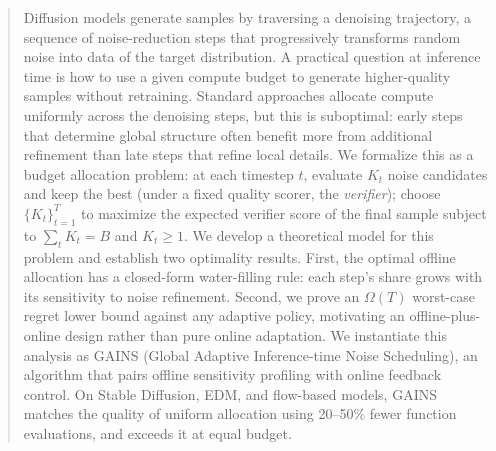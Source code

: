 \begin{abstract}
Diffusion models generate samples by traversing a denoising trajectory, a sequence of noise-reduction steps that progressively transforms random noise into data of the target distribution. A practical question at inference time is how to use a given compute budget to generate higher-quality samples without retraining. Standard approaches allocate compute uniformly across the denoising steps, but this is suboptimal: early steps that determine global structure often benefit more from additional refinement than late steps that refine local details. We formalize this as a budget allocation problem: at each timestep $t$, evaluate $K_t$ noise candidates and keep the best (under a fixed quality scorer, the \emph{verifier}); choose $\{K_t\}_{t=1}^T$ to maximize the expected verifier score of the final sample subject to $\sum_t K_t = B$ and $K_t \ge 1$. We develop a theoretical model for this problem and establish two optimality results. First, the optimal offline allocation has a closed-form water-filling rule: each step's share grows with its sensitivity to noise refinement. Second, we prove an $\Omega(T)$ worst-case regret lower bound against any adaptive policy, motivating an offline-plus-online design rather than pure online adaptation. We instantiate this analysis as \textsc{GAINS} (Global Adaptive Inference-time Noise Scheduling), an algorithm that pairs offline sensitivity profiling with online feedback control. On Stable Diffusion, EDM, and flow-based models, \textsc{GAINS} matches the quality of uniform allocation using 20--50\% fewer function evaluations, and exceeds it at equal budget.
\end{abstract}
